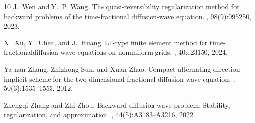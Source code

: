 \documentclass[11pt]{article}
\numberwithin{equation}{section}
\begin{document}
\begin{thebibliography}{10}
J.~Wen and Y.~P. Wang.
\newblock The quasi-reversibility regularization method for backward problems
  of the time-fractional diffusion-wave equation.
, 98(9):095250, 2023.

X.~Xu, Y.~Chen, and J.~Huang.
\newblock L1-type finite element method for time-fractionaldiffusion-wave
  equations on nonuniform grids.
,
  40:e23150, 2024.

Ya-nan Zhang, Zhizhong Sun, and Xuan Zhao.
\newblock Compact alternating direction implicit scheme for the two-dimensional
  fractional diffusion-wave equation.
, 50(3):1535--1555, 2012.

Zhengqi Zhang and Zhi Zhou.
\newblock Backward diffusion-wave problem: Stability, regularization, and
  approximation.
, 44(5):A3183--A3216, 2022.

\end{thebibliography}
\end{document}
